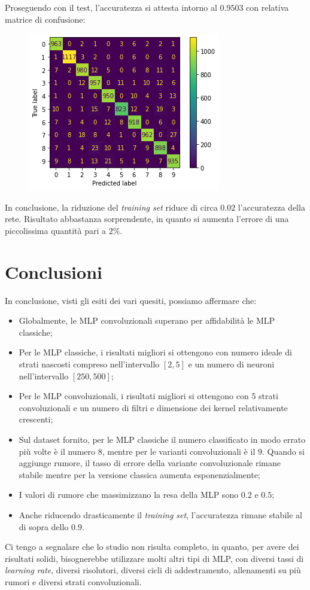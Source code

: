 \documentclass[12pt, a4paper]{article}
\begin{document}
Proseguendo con il test, l'accuratezza si attesta intorno al \(0.9503\) con relativa matrice di confusione:
\begin{figure}[H]
    \centering
    \includegraphics[width=.5\textwidth]{Matrix10.png}
\end{figure}

In conclusione, la riduzione del \textit{training set} riduce di circa \(0.02\) l'accuratezza della rete. Risultato abbastanza sorprendente, in quanto si aumenta l'errore di una piccolissima quantità pari a \(2\%\).

\newpage
\section{Conclusioni}
In conclusione, visti gli esiti dei vari quesiti, possiamo affermare che:
\begin{itemize}
    \item Globalmente, le MLP convoluzionali superano per affidabilità le MLP classiche;
    \item Per le MLP classiche, i risultati migliori si ottengono con numero ideale di strati nascosti compreso nell'intervallo \([2, 5]\) e un numero di neuroni nell'intervallo \([250 , 500]\);
    \item Per le MLP convoluzionali, i risultati migliori si ottengono con 5 strati convoluzionali e un numero di filtri e dimensione dei kernel relativamente crescenti;
    \item Sul dataset fornito, per le MLP classiche il numero classificato in modo errato più volte è il numero \(8\), mentre per le varianti convoluzionali è il \(9\). Quando si aggiunge rumore, il tasso di errore della variante convoluzionale rimane stabile mentre per la versione classica aumenta esponenzialmente;
    \item I valori di rumore che massimizzano la resa della MLP sono \(0.2\) e \(0.5\);
    \item Anche riducendo drasticamente il \textit{training set}, l'accuratezza rimane stabile al di sopra dello \(0.9\).
\end{itemize}

Ci tengo a segnalare che lo studio non risulta completo, in quanto, per avere dei risultati solidi, bisognerebbe utilizzare molti altri tipi di MLP, con diversi tassi di \textit{learning rate}, diversi risolutori, diversi cicli di addestramento, allenamenti su più rumori e diversi strati convoluzionali.
\end{document}
